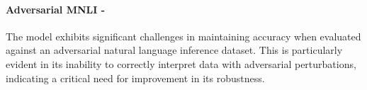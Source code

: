 \paragraph{Adversarial MNLI - \high}
The model exhibits significant challenges in maintaining accuracy when evaluated against an adversarial natural language inference dataset. This is particularly evident in its inability to correctly interpret data with adversarial perturbations, indicating a critical need for improvement in its robustness. 
